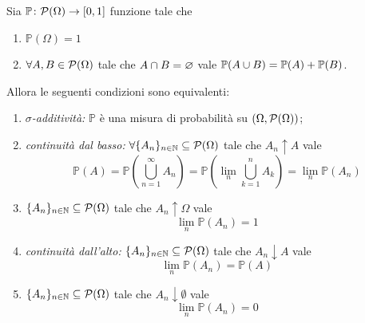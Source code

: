 \documentclass[a4paper]{article}
\begin{document}
\begin{snippettheorem}{}
    Sia \(\mathbb P \colon \mathcal P(\Omega) \to [0,1]\) funzione tale che
    \begin{enumerate}
        \item \(\mathbb P(\Omega) = 1\)
        \item \(\forall A,B \in \mathcal P(\Omega)\)
            tale che \(A \cap B = \varnothing\) vale
            \(\mathbb P(A\cup B) = \mathbb P(A) + \mathbb P(B)\).
    \end{enumerate}
    Allora le seguenti condizioni sono equivalenti:
    \begin{enumerate}[label=\Alph*]
        \item \emph{\(\sigma\)-additività:}
            \(\mathbb P\) è una misura di probabilità su
            \((\Omega, \mathcal P(\Omega))\);
        \item \emph{continuità dal basso:}
            \(\forall \{A_n\}_{n \in \mathbb{N}} \subseteq \mathcal P(\Omega)\)
            tale che \(A_n \uparrow A\)
            vale \[
                \mathbb P(A)
                = \mathbb P\left(
                    \bigcup_{n=1}^\infty A_n
                \right)
                = \mathbb P\left(
                    \lim_n \bigcup_{k=1}^n A_k
                \right)
                = \lim_n \mathbb P(A_n)
            \]
        \item \(\{A_n\}_{n \in \mathbb{N}} \subseteq \mathcal P(\Omega)\)
            tale che \(A_n \uparrow \Omega\) vale \[
                \lim_n \mathbb P(A_n) = 1
            \]
        \item \emph{continuità dall'alto:}
            \(\{A_n\}_{n \in \mathbb{N}} \subseteq \mathcal P(\Omega)\)
            tale che \(A_n \downarrow A\) vale \[
                \lim_n \mathbb P(A_n) = \mathbb P(A)
            \]
        \item \(\{A_n\}_{n \in \mathbb{N}} \subseteq \mathcal P(\Omega)\)
            tale che \(A_n \downarrow \emptyset\) vale \[
                \lim_n \mathbb P(A_n) = 0
            \]
    \end{enumerate}
\end{snippettheorem}
\end{document}
